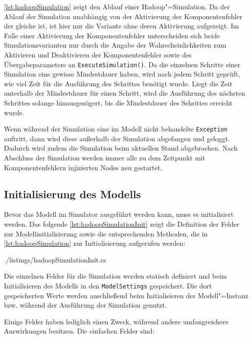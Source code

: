 \autoref{lst:hadoopSimulation} zeigt den Ablauf einer Hadoop"=Simulation.
Da der Ablauf der Simulation unabhängig von der Aktivierung der Komponentenfehler der gleiche ist, ist hier nur die Variante ohne deren Aktivierung aufgezeigt.
Im Falle einer Aktivierung der Komponentenfehler unterscheiden sich beide Simulationsvarianten nur durch die Angabe der Wahrscheinlichkeiten zum Aktivieren und Deaktivieren der Komponentenfehler sowie des Übergabeparameters an \texttt{ExecuteSimulation()}.
Da die einzelnen Schritte einer Simulation eine gewisse Mindestdauer haben, wird nach jedem Schritt geprüft, wie viel Zeit für die Ausführung des Schrittes benötigt wurde.
Liegt die Zeit unterhalb der Mindestdauer für einen Schritt, wird die Ausführung des nächsten Schrittes solange hinausgezögert, bis die Mindestdauer des Schrittes erreicht wurde.

Wenn während der Simulation eine im Modell nicht behandelte \texttt{Exception} auftritt, dann wird diese außerhalb der Simulation abgefangen und geloggt.
Dadurch wird zudem die Simulation beim aktuellen Stand abgebrochen.
Nach Abschluss der Simulation werden immer alle zu dem Zeitpunkt mit Komponentenfehlern injizierten Nodes neu gestartet.

\subsection{Initialisierung des Modells}
\label{sec:simulationModelInit}

Bevor das Modell im Simulator ausgeführt werden kann, muss es initialisiert werden.
Das folgende \autoref{lst:hadoopSimulationInit} zeigt die Definition der Felder zur Modellinitialisierung sowie die entsprechenden Methoden, die in \autoref{lst:hadoopSimulation} zur Initialisierung aufgerufen werden:


{./listings/hadoopSimulationInit.cs}

Die einzelnen Felder für die Simulation werden statisch definiert und beim Initialisieren des Modells in den \texttt{ModelSettings} gespeichert.
Die dort gespeicherten Werte werden anschließend beim Initialisieren der Modell"=Instanz bzw. während der Ausführung der Simulation genutzt.

Einige Felder haben lediglich einen Zweck, während andere umfangreichere Auswirkungen besitzen.
Die einfachen Felder sind:

